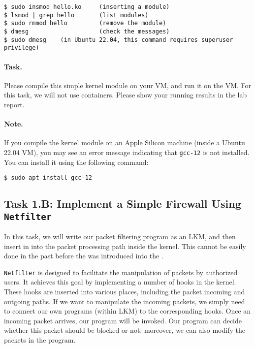 \begin{lstlisting}
$ sudo insmod hello.ko     (inserting a module)
$ lsmod | grep hello       (list modules)
$ sudo rmmod hello         (remove the module)
$ dmesg                    (check the messages)
$ sudo dmesg    (in Ubuntu 22.04, this command requires superuser privilege)
\end{lstlisting}

\paragraph{Task.} Please compile this simple kernel module on 
your VM, and run it on the VM. For this task, we will not use 
containers.  Please show your running results in the lab report. 

\paragraph{Note.} If you compile the kernel module 
on an Apple Silicon machine (inside a Ubuntu 22.04 VM), 
you may see an error message indicating 
that \texttt{gcc-12} is not installed. You can install it using
the following command: 
\begin{lstlisting}
$ sudo apt install gcc-12
\end{lstlisting}
 

\subsection{Task 1.B: Implement a Simple Firewall Using \texttt{Netfilter}}  


In this task, we will write our packet filtering program
as an LKM, and then insert in into the packet processing path
inside the kernel. This cannot be easily done in the past before 
the \netfilter was introduced into the \linux.

{\tt Netfilter} is designed to facilitate the manipulation of 
packets by authorized users. It achieves this 
goal by implementing a number of hooks in the 
\linux kernel. These hooks are inserted into various places, 
including the packet incoming and outgoing paths. 
If we want to manipulate the incoming packets, we simply
need to connect our own programs (within LKM) to the 
corresponding hooks. Once an incoming packet arrives, 
our program will be invoked. Our program can decide 
whether this packet should be blocked or not; moreover,
we can also modify the packets in the program.


